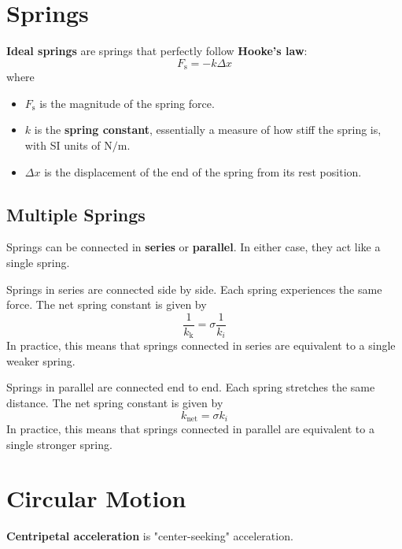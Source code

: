 \documentclass[a4paper, titlepage]{book}
\begin{document}
\section{Springs}

\textbf{Ideal springs} are springs that perfectly follow \textbf{Hooke's law}:
\begin{equation} \label{eq:hookes-law}
    F_\mathrm{s} = -k \Delta{x}
\end{equation}
where
\begin{itemize}
    \item \(F_\mathrm{s}\) is the magnitude of the spring force.
    \item
        \(k\) is the \textbf{spring constant},
        essentially a measure of how stiff the spring is,
        with SI units of \(\unit{\newton \per \metre}\).
    \item \(\Delta{x}\) is the displacement of the end of the spring from its rest position.
\end{itemize}

\subsection{Multiple Springs}

Springs can be connected in \textbf{series} or \textbf{parallel}.
In either case, they act like a single spring.

Springs in series are connected side by side.
Each spring experiences the same force.
The net spring constant is given by
\begin{equation}
    \frac{1}{k_\mathrm{k}} = \sigma \frac{1}{k_i}
\end{equation}
In practice,
this means that springs connected in series are equivalent to a single weaker spring.

Springs in parallel are connected end to end.
Each spring stretches the same distance.
The net spring constant is given by
\begin{equation}
    k_\mathrm{net} = \sigma k_i
\end{equation}
In practice,
this means that springs connected in parallel are equivalent to a single stronger spring.

\section{Circular Motion}

\textbf{Centripetal acceleration} is "center-seeking" acceleration.
\end{document}
